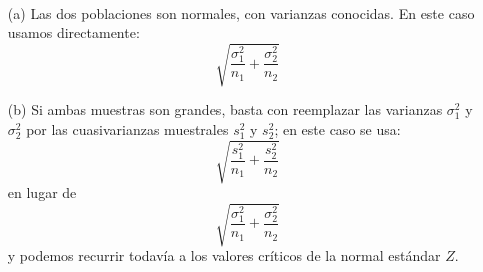 \paragraph{}\label{cap09:lugar:ContrasteDiferenciaMediasVarianzasIguales}\quad\vspace{-7mm}
\begin{enumerate}
    \item[(a)]  {\sf Las dos poblaciones son normales, con varianzas conocidas.} En este caso usamos directamente:
        \[\sqrt{\dfrac{\sigma_1^2}{n_1}+\dfrac{\sigma_2^2}{n_2}}\]
    \item[(b)] {\sf Si ambas  muestras son grandes}, basta con reemplazar las varianzas $\sigma_1^2$ y $\sigma_2^2$ por las cuasivarianzas muestrales $s_1^2$ y $s_2^2$;  en este caso se usa:
        \[\sqrt{\dfrac{s_1^2}{n_1}+\dfrac{s_2^2}{n_2}}\]
        en lugar de
        \[\sqrt{\dfrac{\sigma_1^2}{n_1}+\dfrac{\sigma_2^2}{n_2}}\]
        y podemos recurrir todavía a los valores críticos de la normal estándar $Z$.


\end{enumerate}
